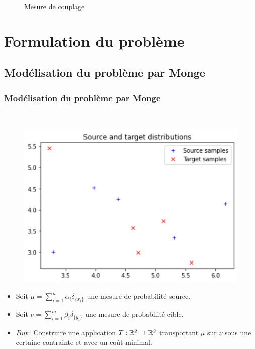 \documentclass{beamer}
\theoremstyle{definition}
\begin{document}
\begin{frame}
\begin{minipage}[t]{1\linewidth}
\begin{minipage}{0.43\linewidth}
\begin{figure}
			\caption*{Mesure de couplage}
	\end{figure}\end{minipage}
\end{minipage}
\end{frame}

\begin{frame}
	\tableofcontents
\end{frame}


\section{Formulation du problème}
\subsection{Modélisation du problème par Monge}

\begin{frame}
	\frametitle{Modélisation du problème par Monge}\hfill\\[-0.8cm]
			\begin{figure}
			\includegraphics[scale=0.42]{a2.png}	\hfill\\[-0.8cm]			
		\end{figure}
	\begin{itemize}
		\item Soit $\displaystyle\mu = \sum_{i=1}^{n}\alpha_i\delta_{\{x_i\}}$ une mesure de probabilité source. 
		\item Soit $\displaystyle \nu = \sum_{i=1}^{m}\beta_i\delta_{\{y_i\}}$ une mesure de probabilité cible.
		\item $\underline{But} :$ Construire une application $T : \mathbb{R}^2 \to \mathbb{R}^2$ transportant $\mu$ sur $\nu$ sous une certaine contrainte et avec un coût minimal. 
	\end{itemize}

\end{frame}
\end{document}
